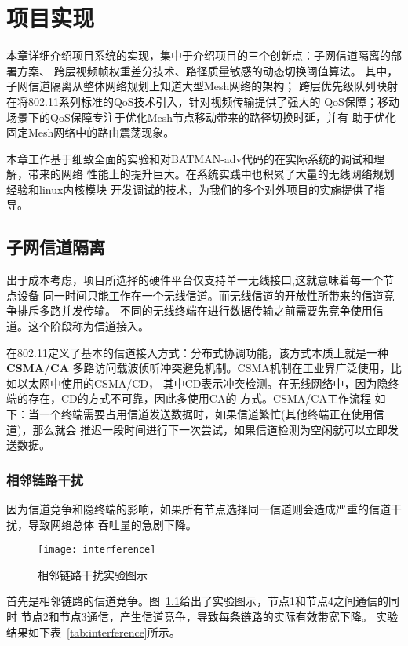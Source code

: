 \chapter{项目实现}
\label{cha:project_implement}
本章详细介绍项目系统的实现，集中于介绍项目的三个创新点：子网信道隔离的部署方案、
跨层视频帧权重差分技术、路径质量敏感的动态切换阈值算法。
其中，子网信道隔离从整体网络规划上知道大型Mesh网络的架构；
跨层优先级队列映射在将802.11系列标准的QoS技术引入，针对视频传输提供了强大的
QoS保障；移动场景下的QoS保障专注于优化Mesh节点移动带来的路径切换时延，并有
助于优化固定Mesh网络中的路由震荡现象。

本章工作基于细致全面的实验和对BATMAN-adv代码的在实际系统的调试和理解，带来的网络
性能上的提升巨大。在系统实践中也积累了大量的无线网络规划经验和linux内核模块
开发调试的技术，为我们的多个对外项目的实施提供了指导。

\section{子网信道隔离}
出于成本考虑，项目所选择的硬件平台仅支持单一无线接口,这就意味着每一个节点设备
同一时间只能工作在一个无线信道。而无线信道的开放性所带来的信道竞争排斥多路并发传输。
不同的无线终端在进行数据传输之前需要先竞争使用信道。这个阶段称为信道接入。

在802.11定义了基本的信道接入方式：分布式协调功能，该方式本质上就是一种\textbf{CSMA/CA}
多路访问载波侦听冲突避免机制。CSMA机制在工业界广泛使用，比如以太网中使用的CSMA/CD，
其中CD表示冲突检测。在无线网络中，因为隐终端的存在，CD的方式不可靠，因此多使用CA的
方式。CSMA/CA工作流程
如下：当一个终端需要占用信道发送数据时，如果信道繁忙(其他终端正在使用信道)，那么就会
推迟一段时间进行下一次尝试，如果信道检测为空闲就可以立即发送数据。

\subsection{相邻链路干扰}
因为信道竞争和隐终端的影响，如果所有节点选择同一信道则会造成严重的信道干扰，导致网络总体
吞吐量的急剧下降。
\begin{figure}[H] %
  \centering
  \texttt{[image: interference]}
  \caption{相邻链路干扰实验图示}
  \label{fig:interference}
\end{figure}

首先是相邻链路的信道竞争。图~\ref{fig:interference}给出了实验图示，节点1和节点4之间通信的同时
节点2和节点3通信，产生信道竞争，导致每条链路的实际有效带宽下降。
实验结果如下表~\ref{tab:interference}所示。


